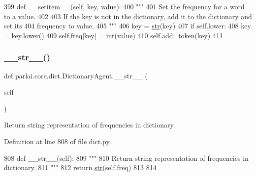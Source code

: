 \begin{DoxyCode}
399     \textcolor{keyword}{def }\_\_setitem\_\_(self, key, value):
400         \textcolor{stringliteral}{"""}
401 \textcolor{stringliteral}{        Set the frequency for a word to a value.}
402 \textcolor{stringliteral}{}
403 \textcolor{stringliteral}{        If the key is not in the dictionary, add it to the dictionary and set its}
404 \textcolor{stringliteral}{        frequency to value.}
405 \textcolor{stringliteral}{        """}
406         key = \hyperlink{namespacegenerate__task__READMEs_a5b88452ffb87b78c8c85ececebafc09f}{str}(key)
407         \textcolor{keywordflow}{if} self.lower:
408             key = key.lower()
409         self.freq[key] = \hyperlink{namespacelanguage__model_1_1eval__ppl_a7d12ee00479673c5c8d1f6d01faa272a}{int}(value)
410         self.add\_token(key)
411 
\end{DoxyCode}
\mbox{\label{classparlai_1_1core_1_1dict_1_1DictionaryAgent_a4b822841903bedb2b0f866e7bd17f3fa}} 
\subsubsection{\texorpdfstring{\+\_\+\+\_\+str\+\_\+\+\_\+()}{\_\_str\_\_()}}
{\footnotesize\ttfamily def parlai.\+core.\+dict.\+Dictionary\+Agent.\+\_\+\+\_\+str\+\_\+\+\_\+ (\begin{DoxyParamCaption}\item[{}]{self }\end{DoxyParamCaption})}

\begin{DoxyVerb}Return string representation of frequencies in dictionary.
\end{DoxyVerb}
 

Definition at line 808 of file dict.\+py.


\begin{DoxyCode}
808     \textcolor{keyword}{def }\_\_str\_\_(self):
809         \textcolor{stringliteral}{"""}
810 \textcolor{stringliteral}{        Return string representation of frequencies in dictionary.}
811 \textcolor{stringliteral}{        """}
812         \textcolor{keywordflow}{return} \hyperlink{namespacegenerate__task__READMEs_a5b88452ffb87b78c8c85ececebafc09f}{str}(self.freq)
813 
814 
\end{DoxyCode}
\mbox{\label{classparlai_1_1core_1_1dict_1_1DictionaryAgent_af34b92857b41748aafdecee34ebf9345}} 
